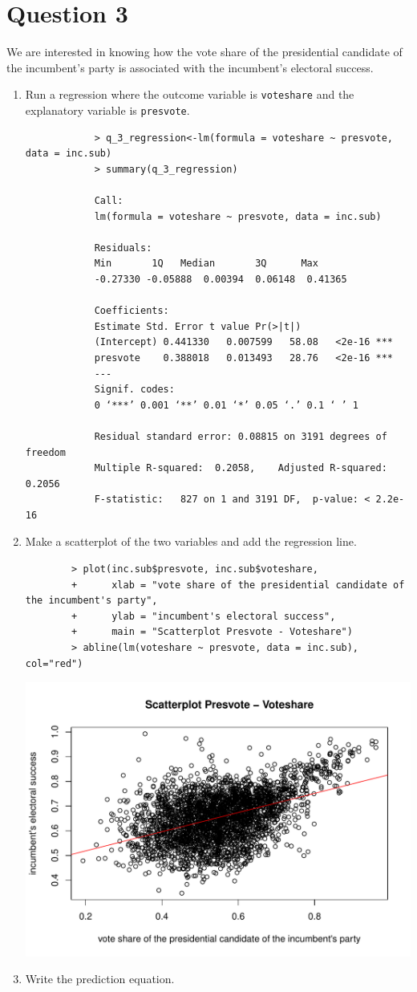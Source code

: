 \documentclass[12pt,letterpaper]{article}
\begin{document}
	\newpage	
\section*{Question 3}

\noindent We are interested in knowing how the vote share of the presidential candidate of the incumbent's party is associated with the incumbent's electoral success.
	\vspace{.25cm}
	\begin{enumerate}
		\item Run a regression where the outcome variable is \texttt{voteshare} and the explanatory variable is \texttt{presvote}. 
		\begin{verbatim}
			> q_3_regression<-lm(formula = voteshare ~ presvote, data = inc.sub)
			> summary(q_3_regression)
			
			Call:
			lm(formula = voteshare ~ presvote, data = inc.sub)
			
			Residuals:
			Min       1Q   Median       3Q      Max 
			-0.27330 -0.05888  0.00394  0.06148  0.41365 
			
			Coefficients:
			Estimate Std. Error t value Pr(>|t|)    
			(Intercept) 0.441330   0.007599   58.08   <2e-16 ***
			presvote    0.388018   0.013493   28.76   <2e-16 ***
			---
			Signif. codes:  
			0 ‘***’ 0.001 ‘**’ 0.01 ‘*’ 0.05 ‘.’ 0.1 ‘ ’ 1
			
			Residual standard error: 0.08815 on 3191 degrees of freedom
			Multiple R-squared:  0.2058,	Adjusted R-squared:  0.2056 
			F-statistic:   827 on 1 and 3191 DF,  p-value: < 2.2e-16
		\end{verbatim}
		\item Make a scatterplot of the two variables and add the regression line. \\
		\begin{verbatim}
		> plot(inc.sub$presvote, inc.sub$voteshare,
		+      xlab = "vote share of the presidential candidate of the incumbent's party",
		+      ylab = "incumbent's electoral success",
		+      main = "Scatterplot Presvote - Voteshare")
		> abline(lm(voteshare ~ presvote, data = inc.sub), col="red")
			\end{verbatim} \includegraphics[width=\textwidth,height=\textheight,keepaspectratio]{Q_3_Plot}
		\item Write the prediction equation.\\
		

\end{enumerate}
\end{document}
